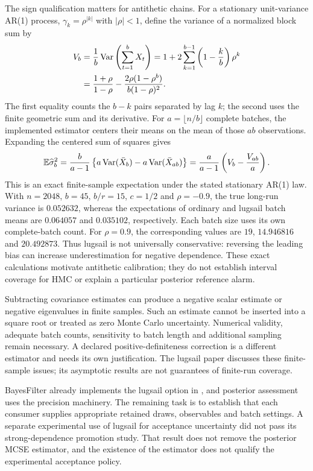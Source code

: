 The sign qualification matters for antithetic chains. For a stationary
unit-variance AR(1) process, $\gamma_k=\rho^{|k|}$ with $|\rho|<1$, define the
variance of a normalized block sum by
\begin{align}
 V_b&=\frac1b\operatorname{Var}\left(\sum_{t=1}^b X_t\right)
     =1+2\sum_{k=1}^{b-1}\left(1-\frac{k}{b}\right)\rho^k\\
    &=\frac{1+\rho}{1-\rho}
       -\frac{2\rho(1-\rho^b)}{b(1-\rho)^2}.
 \label{eq:bf-modern-ar1-finite-block}
\end{align}
The first equality counts the $b-k$ pairs separated by lag $k$; the second
uses the finite geometric sum and its derivative. For $a=\lfloor n/b\rfloor$
complete batches, the implemented estimator centers their means on the mean
of those $ab$ observations. Expanding the centered sum of squares gives
\[
 \mathbb{E}\widehat\sigma_b^2
 =\frac{b}{a-1}\left\{a\operatorname{Var}(\bar X_b)
                      -a\operatorname{Var}(\bar X_{ab})\right\}
 =\frac{a}{a-1}\left(V_b-\frac{V_{ab}}{a}\right).
\]
This is an exact finite-sample expectation under the stated stationary AR(1)
law. With $n=2048$, $b=45$, $b/r=15$, $c=1/2$ and $\rho=-0.9$, the true
long-run variance is $0.052632$, whereas the expectations of ordinary and
lugsail batch means are $0.064057$ and $0.035102$, respectively. Each batch
size uses its own complete-batch count. For $\rho=0.9$, the corresponding
values are $19$, $14.946816$ and $20.492873$. Thus lugsail is not universally
conservative: reversing the leading bias can increase underestimation for
negative dependence. These exact calculations motivate antithetic calibration;
they do not establish interval coverage for HMC or explain a particular
posterior reference alarm.

Subtracting covariance estimates can produce a negative scalar estimate or
negative eigenvalues in finite samples. Such an estimate cannot be inserted
into a square root or treated as zero Monte Carlo uncertainty. Numerical
validity, adequate batch counts, sensitivity to batch length and additional
sampling remain necessary. A declared positive-definiteness correction is a
different estimator and needs its own justification. The lugsail paper
discusses these finite-sample issues; its asymptotic results are not guarantees
of finite-run coverage.

BayesFilter already implements the lugsail option in
, and posterior assessment uses
the precision machinery. The remaining task is to establish that each
consumer supplies appropriate retained draws, observables and batch settings.
A separate experimental use of lugsail for acceptance uncertainty did not
pass its strong-dependence promotion study. That result does not remove the
posterior MCSE estimator, and the existence of the estimator does not qualify
the experimental acceptance policy.

